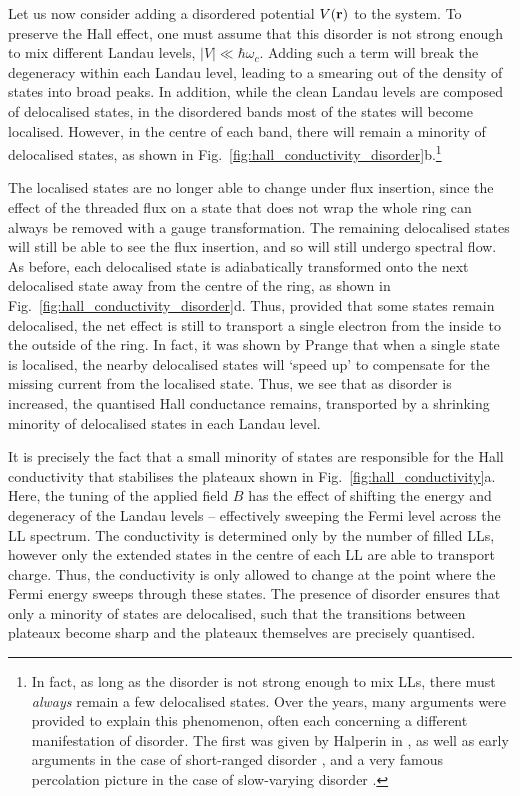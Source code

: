 Let us now consider adding a disordered potential $V(\textbf r)$ to the system. To preserve the Hall effect, one must assume that this disorder is not strong enough to mix different Landau levels, $|V| \ll \hbar \omega_c$. Adding such a term will break the degeneracy within each Landau level, leading to a smearing out of the density of states into broad peaks. In addition, while the clean Landau levels are composed of delocalised states, in the disordered bands most of the states will become localised. However, in the centre of each band, there will remain a minority of delocalised states, as shown in Fig.~\ref{fig:hall_conductivity_disorder}b.\footnote{In fact, as long as the disorder is not strong enough to mix LLs, there must \textit{always} remain a few delocalised states. Over the years, many arguments were provided to explain this phenomenon, often each concerning a different manifestation of disorder. The first was given by Halperin in \cite{haplerin_quantized_1982}, as well as early arguments in the case of short-ranged disorder \cite{aoki_critical_1985, hikami_localization_1986}, and a very famous percolation picture in the case of slow-varying disorder \cite{chalker_percolation_1988}.}

The localised states are no longer able to change under flux insertion, since the effect of the threaded flux on a state that does not wrap the whole ring can always be removed with a gauge transformation. The remaining delocalised states will still be able to see the flux insertion, and so will still undergo spectral flow. As before, each delocalised state is adiabatically transformed onto the next delocalised state away from the centre of the ring, as shown in Fig.~\ref{fig:hall_conductivity_disorder}d. Thus, provided that some states remain delocalised, the net effect is still to transport a single electron from the inside to the outside of the ring. In fact, it was shown by Prange \cite{prange_quantized_1981} that when a single state is localised, the nearby delocalised states will `speed up' to compensate for the missing current from the localised state. Thus, we see that as disorder is increased, the quantised Hall conductance remains, transported by a shrinking minority of delocalised states in each Landau level.

It is precisely the fact that a small minority of states are responsible for the Hall conductivity that stabilises the plateaux shown in Fig.~\ref{fig:hall_conductivity}a. Here, the tuning of the applied field $B$ has the effect of shifting the energy and degeneracy of the Landau levels -- effectively sweeping the Fermi level across the LL spectrum. The conductivity is determined only by the number of filled LLs, however only the extended states in the centre of each LL are able to transport charge. Thus, the conductivity is only allowed to change at the point where the Fermi energy sweeps through these states. The presence of disorder ensures that only a minority of states are delocalised, such that the transitions between plateaux become sharp and the plateaux themselves are precisely quantised. 

